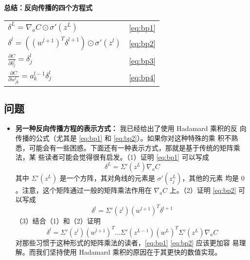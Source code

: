 \begin{center}
  \begin{minipage}{0.7\textwidth}
    \begin{framed}
      \centering
      \textbf{总结：反向传播的四个方程式}\\
      \vspace{1.5ex}
      \begin{tabular}{ll}
        $\delta^L = \nabla_a C \odot \sigma'(z^L)$            & \hspace{2cm}\eqref{eq:bp1} \\[1.5ex]
        $\delta^l = ((w^{l+1})^T \delta^{l+1}) \odot \sigma'(z^l)$ & \hspace{2cm}\eqref{eq:bp2} \\[1.5ex]
        $\frac{\partial C}{\partial b^l_j} = \delta^l_j$       & \hspace{2cm}\eqref{eq:bp3} \\[1.5ex]
        $\frac{\partial C}{\partial w^l_{jk}} = a^{l-1}_k \delta^l_j$ & \hspace{2cm}\eqref{eq:bp4}
      \end{tabular}
    \end{framed}
  \end{minipage}
\end{center}

\subsection*{问题}

\begin{itemize}
\item \textbf{另一种反向传播方程的表示方式：} 我已经给出了使用 Hadamard 乘积的反
  向传播的公式（尤其是 \eqref{eq:bp1} 和 \eqref{eq:bp2}）。如果你对这种特殊的乘
  积不熟悉，可能会有一些困惑。下面还有一种表示方式，那就是基于传统的矩阵乘法，某
  些读者可能会觉得很有启发。（1）证明 \eqref{eq:bp1} 可以写成
  \begin{equation}
    \delta^L = \Sigma'(z^L) \nabla_a C
    \label{eq:33}\tag{33}
  \end{equation}
  其中 $\Sigma'(z^L)$ 是一个方阵，其对角线的元素是 $\sigma'(z_j^L)$，其他的元素
  均是 $0$。注意，这个矩阵通过一般的矩阵乘法作用在 $\nabla_a C$ 上。（2）证明
  \eqref{eq:bp2} 可以写成
  \begin{equation}
    \delta^l = \Sigma'(z^l) (w^{l+1})^T \delta^{l+1}
    \label{eq:34}\tag{34}
  \end{equation}
  （3）结合（1）和（2）证明
  \begin{equation}
    \delta^l = \Sigma'(z^l) (w^{l+1})^T \ldots \Sigma'(z^{L-1}) (w^L)^T
    \Sigma'(z^L) \nabla_a C
    \label{eq:35}\tag{35}
  \end{equation}
  对那些习惯于这种形式的矩阵乘法的读者，\eqref{eq:bp1} \eqref{eq:bp2} 应该更加容
  易理解。而我们坚持使用 Hadamard 乘积的原因在于其更快的数值实现。
\end{itemize}

